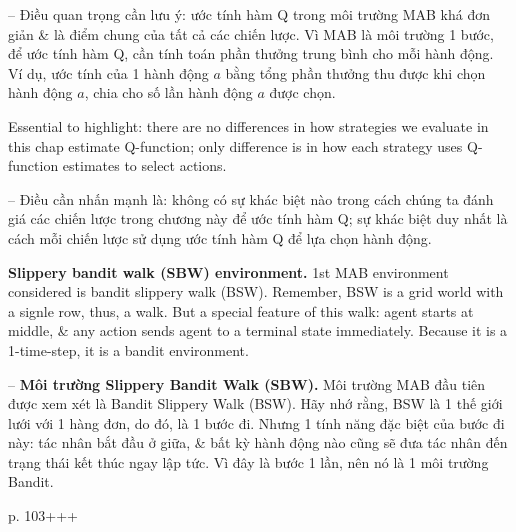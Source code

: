 \documentclass{article}
\begin{document}
\begin{itemize}
\begin{itemize}
\begin{itemize}
            -- Điều quan trọng cần lưu ý: ước tính hàm Q trong môi trường MAB khá đơn giản \& là điểm chung của tất cả các chiến lược. Vì MAB là môi trường 1 bước, để ước tính hàm Q, cần tính toán phần thưởng trung bình cho mỗi hành động. Ví dụ, ước tính của 1 hành động $a$ bằng tổng phần thưởng thu được khi chọn hành động $a$, chia cho số lần hành động $a$ được chọn.

            Essential to highlight: there are no differences in how strategies we evaluate in this chap estimate Q-function; only difference is in how each strategy uses Q-function estimates to select actions.

            -- Điều cần nhấn mạnh là: không có sự khác biệt nào trong cách chúng ta đánh giá các chiến lược trong chương này để ước tính hàm Q; sự khác biệt duy nhất là cách mỗi chiến lược sử dụng ước tính hàm Q để lựa chọn hành động.

            {\bf Slippery bandit walk (SBW) environment.} 1st MAB environment considered is bandit slippery walk (BSW). Remember, BSW is a grid world with a signle row, thus, a walk. But a special feature of this walk: agent starts at middle, \& any action sends agent to a terminal state immediately. Because it is a 1-time-step, it is a bandit environment.

            -- {\bf Môi trường Slippery Bandit Walk (SBW).} Môi trường MAB đầu tiên được xem xét là Bandit Slippery Walk (BSW). Hãy nhớ rằng, BSW là 1 thế giới lưới với 1 hàng đơn, do đó, là 1 bước đi. Nhưng 1 tính năng đặc biệt của bước đi này: tác nhân bắt đầu ở giữa, \& bất kỳ hành động nào cũng sẽ đưa tác nhân đến trạng thái kết thúc ngay lập tức. Vì đây là bước 1 lần, nên nó là 1 môi trường Bandit.

            p. 103+++


\end{itemize}
\end{itemize}
\end{itemize}
\end{document}
